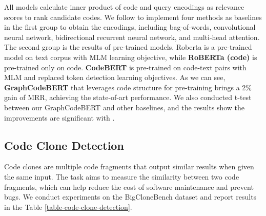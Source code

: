 \documentclass{article} \usepackage{iclr2021_conference,times}
\begin{document}
All models calculate inner product of code and query encodings as relevance scores to rank candidate codes.
We follow \citet{husain2019codesearchnet} to implement four methods as baselines  in the first group to obtain the encodings, including bag-of-words, convolutional neural network, bidirectional recurrent neural network, and multi-head attention.
The second group is the results of pre-trained models. Roberta \citep{liu2019roberta} is a pre-trained model on text corpus with MLM learning objective, while \textbf{RoBERTa (code)} is pre-trained only on code.
\textbf{CodeBERT} \citep{feng2020codebert} is pre-trained on code-text pairs with MLM and replaced token detection learning objectives.
As we can see, \textbf{GraphCodeBERT} that leverages code structure for pre-training brings a 2\% gain of MRR, achieving the state-of-art performance. We also conducted t-test between our GraphCodeBERT and other baselines, and the results show the improvements are significant with .





\subsection{Code Clone Detection}\label{section:experiment-clone detection}
Code clones are multiple code fragments that output similar results when given the same input. 
The task aims to measure the similarity between two code fragments, which can help  reduce the cost of software maintenance and prevent bugs.
We conduct experiments on the BigCloneBench dataset \citep{svajlenko2014towards} and report results in the Table \ref{table-code-clone-detection}. 
\end{document}
